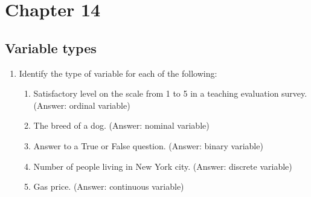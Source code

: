 \documentclass[11pt,a4paper,onecolumn]{article}
\begin{document}
\section{Chapter 14}


\subsection{Variable types}
\begin{enumerate}

\item Identify the type of variable for each of the following:
\begin{enumerate}
	\item Satisfactory level on the scale from 1 to 5 in a teaching evaluation survey. (Answer: ordinal variable)
	\item The breed of a dog. (Answer: nominal variable)
	\item Answer to a True or False question. (Answer: binary variable)
	\item Number of people living in New York city. (Answer: discrete variable)
	\item Gas price. (Answer: continuous variable)
\end{enumerate}

\end{enumerate}
\end{document}
